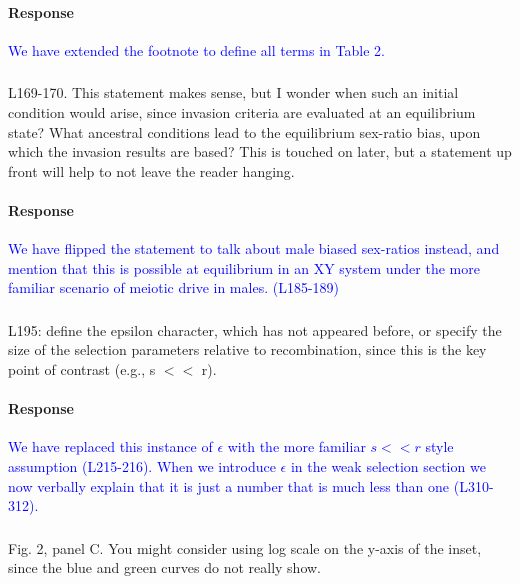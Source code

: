 \documentclass[10pt,letterpaper]{article}
\begin{document}
\noindent\paragraph{Response}
\textcolor{blue}{We have extended the footnote to define all terms in Table 2.}

\noindent\subsubsection{}
L169-170. This statement makes sense, but I wonder when such an initial condition would arise, since invasion criteria are evaluated at an equilibrium state? What ancestral conditions lead to the equilibrium sex-ratio bias, upon which the invasion results are based? This is touched on later, but a statement up front will help to not leave the reader hanging.

\noindent\paragraph{Response}
\textcolor{blue}{We have flipped the statement to talk about male biased sex-ratios instead, and mention that this is possible at equilibrium in an XY system under the more familiar scenario of meiotic drive in males. (L185-189)}

\noindent\subsubsection{}
L195: define the epsilon character, which has not appeared before, or specify the size of the selection parameters relative to recombination, since this is the key point of contrast (e.g., s $<<$ r).

\noindent\paragraph{Response}
\textcolor{blue}{We have replaced this instance of $\epsilon$ with the more familiar $s<<r$ style assumption (L215-216). 
When we introduce $\epsilon$ in the weak selection section we now verbally explain that it is just a number that is much less than one (L310-312).}

\noindent\subsubsection{}
Fig. 2, panel C. You might consider using log scale on the y-axis of the inset, since the blue and green curves do not really show.
\end{document}
